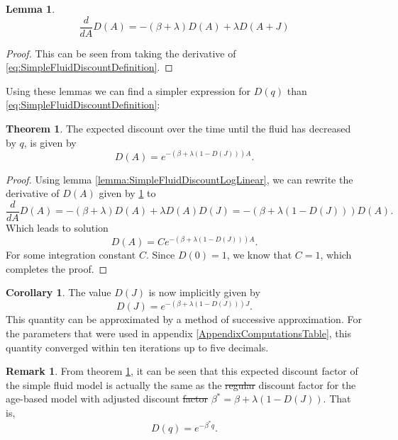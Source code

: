 \documentclass[a4paper]{thesis}
\theoremstyle{definition}
\newtheorem{remark}{Remark}[chapter]
\newtheorem{corollary}{Corollary}[chapter]
\newtheorem{theorem}{Theorem}[chapter] %
\newtheorem{lemma}{Lemma}[chapter]  %
\providecommand{\DIFaddtex}[1]{{\protect\color{blue}\uwave{#1}}} %
\providecommand{\DIFdeltex}[1]{{\protect\color{red}\sout{#1}}}                      %
\providecommand{\DIFaddbegin}{} %
\providecommand{\DIFaddend}{} %
\providecommand{\DIFdelbegin}{} %
\providecommand{\DIFdelend}{} %
\providecommand{\DIFadd}[1]{\texorpdfstring{\DIFaddtex{#1}}{#1}} %
\providecommand{\DIFdel}[1]{\texorpdfstring{\DIFdeltex{#1}}{}} %
\newcommand{\DIFscaledelfig}{0.5}
\newlength{\DIFdelgraphicswidth} %
\newlength{\DIFdelgraphicsheight} %
\newcommand{\DIFaddincludegraphics}[2][]{{\color{blue}\fbox{\DIFOincludegraphics[#1]{#2}}}} %
\newcommand{\DIFdelincludegraphics}[2][]{%
	\sbox{\DIFdelgraphicsbox}{\DIFOincludegraphics[#1]{#2}}%
	\settoboxwidth{\DIFdelgraphicswidth}{\DIFdelgraphicsbox} %
	\settoboxtotalheight{\DIFdelgraphicsheight}{\DIFdelgraphicsbox} %
	\scalebox{\DIFscaledelfig}{%
		\parbox[b]{\DIFdelgraphicswidth}{\usebox{\DIFdelgraphicsbox}\\[-\baselineskip] \rule{\DIFdelgraphicswidth}{0em}}\llap{\resizebox{\DIFdelgraphicswidth}{\DIFdelgraphicsheight}{%
				\setlength{\unitlength}{\DIFdelgraphicswidth}%
				\begin{picture}(1,1)%
				\thicklines\linethickness{2pt} %
				{\color[rgb]{1,0,0}\put(0,0){\framebox(1,1){}}}%
				{\color[rgb]{1,0,0}\put(0,0){\line( 1,1){1}}}%
				{\color[rgb]{1,0,0}\put(0,1){\line(1,-1){1}}}%
				\end{picture}%
			}\hspace*{3pt}}} %
} %
\DeclareRobustCommand{\DIFaddbegin}{\DIFOaddbegin \let\includegraphics\DIFaddincludegraphics} %
\DeclareRobustCommand{\DIFaddend}{\DIFOaddend \let\includegraphics\DIFOincludegraphics} %
\DeclareRobustCommand{\DIFdelbegin}{\DIFOdelbegin \let\includegraphics\DIFdelincludegraphics} %
\DeclareRobustCommand{\DIFdelend}{\DIFOaddend \let\includegraphics\DIFOincludegraphics} %
\begin{document}
	\begin{lemma}\label{lemma:SimpleFluidDiscountODE}
		$$\frac{d}{dA}D(A)=-(\beta+\lambda)D(A)+\lambda D(A+J)$$
		\begin{proof}
			This can be seen from taking the derivative of \eqref{eq:SimpleFluidDiscountDefinition}.
		\end{proof}
	\end{lemma}
	Using these lemmas we can find a simpler expression for $D(q)$ than \eqref{eq:SimpleFluidDiscountDefinition}:
	\begin{theorem}\label{theorem:SimpleFluidDiscountExpression}
		The expected discount over the time until the fluid has decreased by $q$, is given by
		\[
		D(A)=e^{-(\beta+\lambda(1-D(J)))A}.
		\]
		\begin{proof}
			Using lemma \ref{lemma:SimpleFluidDiscountLogLinear}, we can rewrite the derivative of $D(A)$ given by \ref{lemma:SimpleFluidDiscountODE} to
			\[
			\frac{d}{dA}D(A)=-(\beta+\lambda)D(A)+\lambda D(A)D(J)=-(\beta+\lambda(1-D(J)))D(A).
			\]
			Which leads to solution
			\[
			D(A)=Ce^{-(\beta+\lambda(1-D(J)))A}.
			\]
			For some integration constant $C$. Since $D(0)=1$, we know that $C=1$, which completes the proof.
		\end{proof}
	\end{theorem}
	\begin{corollary}
		The value $D(J)$ is now implicitly given by
		\[
		D(J)=e^{-(\beta+\lambda(1-D(J)))J}.
		\]
		This quantity can be approximated by a method of successive approximation.
		For the parameters that were used in appendix \ref{AppendixComputationsTable}, this quantity converged within ten iterations up to five decimals.
	\end{corollary}
	\begin{remark}\label{remark:SimpleFluidDiscountEquivalence}
		From theorem \ref{theorem:SimpleFluidDiscountExpression}, it can be seen that this expected discount factor of the simple fluid model is actually the same as the \DIFdelbegin \DIFdel{regular }\DIFdelend discount factor for the age-based model with adjusted discount \DIFdelbegin \DIFdel{factor }\DIFdelend \DIFaddbegin \DIFadd{exponent }\DIFaddend $\beta^*=\beta+\lambda(1-D(J))$.
		That is,
		\[
		D(q)=e^{-\beta^*q}.
		\]
	\end{remark}
	
\end{document}
